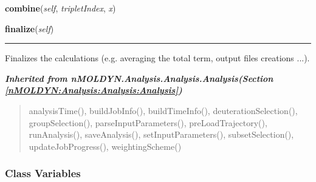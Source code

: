 \hspace{.8\funcindent}\begin{boxedminipage}{\funcwidth}

    \raggedright \textbf{combine}(\textit{self}, \textit{tripletIndex}, \textit{x})

\setlength{\parskip}{2ex}
\setlength{\parskip}{1ex}
    \end{boxedminipage}

    \label{nMOLDYN:Analysis:Dynamics:AngularCorrelation:finalize}

    \vspace{0.5ex}

\hspace{.8\funcindent}\begin{boxedminipage}{\funcwidth}

    \raggedright \textbf{finalize}(\textit{self})

    \vspace{-1.5ex}

    \rule{\textwidth}{0.5\fboxrule}
\setlength{\parskip}{2ex}
    Finalizes the calculations (e.g. averaging the total term, output files
    creations ...).

\setlength{\parskip}{1ex}
    \end{boxedminipage}


\large{\textbf{\textit{Inherited from nMOLDYN.Analysis.Analysis.Analysis\textit{(Section \ref{nMOLDYN:Analysis:Analysis:Analysis})}}}}

\begin{quote}
analysisTime(), buildJobInfo(), buildTimeInfo(), deuterationSelection(), groupSelection(), parseInputParameters(), preLoadTrajectory(), runAnalysis(), saveAnalysis(), setInputParameters(), subsetSelection(), updateJobProgress(), weightingScheme()
\end{quote}


  \subsubsection{Class Variables}

